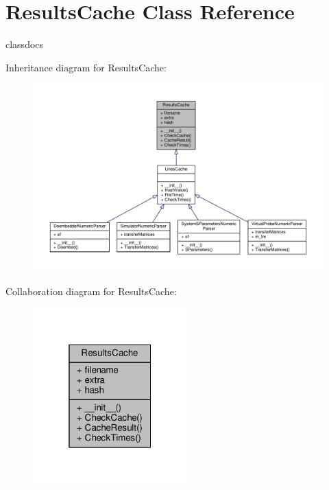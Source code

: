 \hypertarget{classSignalIntegrity_1_1ResultsCache_1_1ResultsCache}{}\section{Results\+Cache Class Reference}
\label{classSignalIntegrity_1_1ResultsCache_1_1ResultsCache}


classdocs  




Inheritance diagram for Results\+Cache\+:
\nopagebreak
\begin{figure}[H]
\begin{center}
\leavevmode
\includegraphics[width=350pt]{classSignalIntegrity_1_1ResultsCache_1_1ResultsCache__inherit__graph}
\end{center}
\end{figure}


Collaboration diagram for Results\+Cache\+:
\nopagebreak
\begin{figure}[H]
\begin{center}
\leavevmode
\includegraphics[width=169pt]{classSignalIntegrity_1_1ResultsCache_1_1ResultsCache__coll__graph}
\end{center}
\end{figure}
